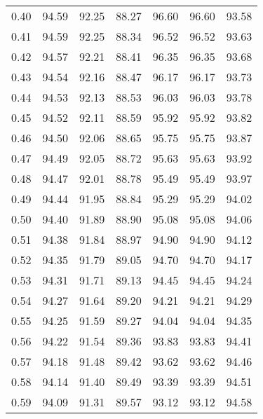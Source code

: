 \begin{tabular}{|c|c|c|c|c|c|c|}
      0.40 &     94.59 &     92.25 &      88.27 &   96.60 &      96.60 &         93.58 \\
      0.41 &     94.59 &     92.25 &      88.34 &   96.52 &      96.52 &         93.63 \\
      0.42 &     94.57 &     92.21 &      88.41 &   96.35 &      96.35 &         93.68 \\
      0.43 &     94.54 &     92.16 &      88.47 &   96.17 &      96.17 &         93.73 \\
      0.44 &     94.53 &     92.13 &      88.53 &   96.03 &      96.03 &         93.78 \\
      0.45 &     94.52 &     92.11 &      88.59 &   95.92 &      95.92 &         93.82 \\
      0.46 &     94.50 &     92.06 &      88.65 &   95.75 &      95.75 &         93.87 \\
      0.47 &     94.49 &     92.05 &      88.72 &   95.63 &      95.63 &         93.92 \\
      0.48 &     94.47 &     92.01 &      88.78 &   95.49 &      95.49 &         93.97 \\
      0.49 &     94.44 &     91.95 &      88.84 &   95.29 &      95.29 &         94.02 \\
      0.50 &     94.40 &     91.89 &      88.90 &   95.08 &      95.08 &         94.06 \\
      0.51 &     94.38 &     91.84 &      88.97 &   94.90 &      94.90 &         94.12 \\
      0.52 &     94.35 &     91.79 &      89.05 &   94.70 &      94.70 &         94.17 \\
      0.53 &     94.31 &     91.71 &      89.13 &   94.45 &      94.45 &         94.24 \\
      0.54 &     94.27 &     91.64 &      89.20 &   94.21 &      94.21 &         94.29 \\
      0.55 &     94.25 &     91.59 &      89.27 &   94.04 &      94.04 &         94.35 \\
      0.56 &     94.22 &     91.54 &      89.36 &   93.83 &      93.83 &         94.41 \\
      0.57 &     94.18 &     91.48 &      89.42 &   93.62 &      93.62 &         94.46 \\
      0.58 &     94.14 &     91.40 &      89.49 &   93.39 &      93.39 &         94.51 \\
      0.59 &     94.09 &     91.31 &      89.57 &   93.12 &      93.12 &         94.58 \\

\end{tabular}
